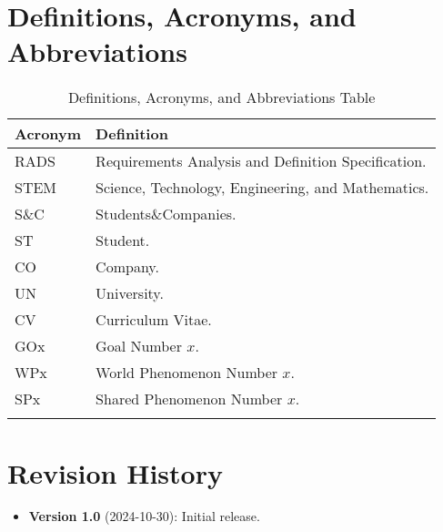 \section{Definitions, Acronyms, and Abbreviations}
\label{sec:definitions-acronyms-abbreviations}%

\begin{longtable}{|l|p{}|}
    \hline
    \textbf{Acronym} & \textbf{Definition}                                 \\
    \hline \hline
    RADS             & Requirements Analysis and Definition Specification. \\
    \hline
    STEM             & Science, Technology, Engineering, and Mathematics.  \\
    \hline
    S\&C             & Students\&Companies.                                \\
    \hline
    ST               & Student.                                            \\
    \hline
    CO               & Company.                                            \\
    \hline
    UN               & University.                                         \\
    \hline
    CV               & Curriculum Vitae.                                   \\
    \hline
    GOx              & Goal Number $x$.                                    \\
    \hline
    WPx              & World Phenomenon Number $x$.                        \\
    \hline
    SPx              & Shared Phenomenon Number $x$.                       \\
    \hline
    \caption{Definitions, Acronyms, and Abbreviations Table}
    \label{tab:definitions-acronyms-abbreviations}
\end{longtable}

\section{Revision History}
\label{sec:revision-history}%

\begin{itemize}
    \item \textbf{Version 1.0} (2024-10-30): Initial release.
\end{itemize}

